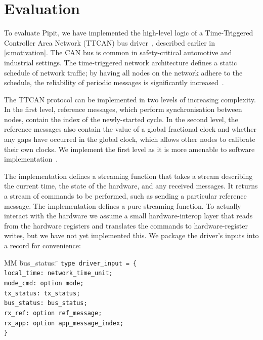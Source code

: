 \documentclass[a4paper,UKenglish,cleveref, autoref, thm-restate,anonymous]{lipics-v2021}
\begin{document}
\section{Evaluation}
\label{s:evaluation}

To evaluate Pipit, we have implemented the high-level logic of a Time-Triggered Controller Area Network (TTCAN) bus driver~\cite{ISO11898_4}, described earlier in \autoref{s:motivation}.
The CAN bus is common in safety-critical automotive and industrial settings.
The time-triggered network architecture defines a static schedule of network traffic;
by having all nodes on the network adhere to the schedule, the reliability of periodic messages is significantly increased~\cite{fuehrer2001time}.

The TTCAN protocol can be implemented in two levels of increasing complexity.
In the first level, reference messages, which perform synchronisation between nodes, contain the index of the newly-started cycle.
In the second level, the reference messages also contain the value of a global fractional clock and whether any gaps have occurred in the global clock, which allows other nodes to calibrate their own clocks.
We implement the first level as it is more amenable to software implementation~\cite{hartwich2002integration}.

The implementation defines a streaming function that takes a stream describing the current time, the state of the hardware, and any received messages.
It returns a stream of commands to be performed, such as sending a particular reference message.
The implementation defines a pure streaming function.
To actually interact with the hardware we assume a small hardware-interop layer that reads from the hardware registers and translates the commands to hardware-register writes, but we have not yet implemented this.
We package the driver's inputs into a record for convenience:

\begin{tabbing}
  MM \= bus_status: \= \kill
  \tt{type} driver_input = \{ \\
    \> local_time: \> network_time_unit; \\
    \> mode_cmd: \> option mode; \\
    \> tx_status: \> tx_status; \\
    \> bus_status: \> bus_status; \\
    \> rx_ref: \> option ref_message; \\
    \> rx_app: \> option app_message_index; \\
    \}
\end{tabbing}
\end{document}
